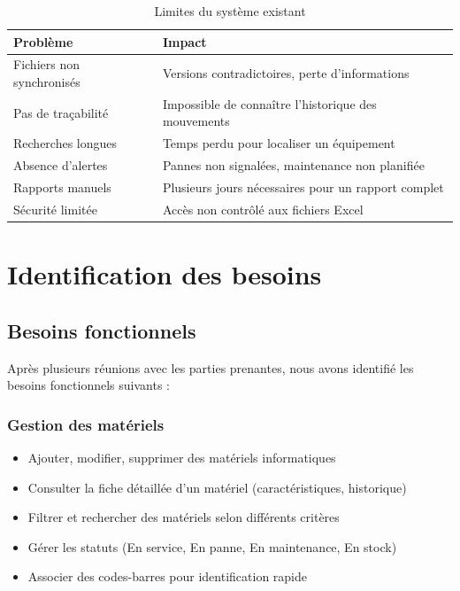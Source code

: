 \documentclass[12pt,a4paper]{report}
\begin{document}
\begin{table}[H]
\centering
\caption{Limites du système existant}
\begin{tabularx}{\textwidth}{|l|X|}
\hline
\textbf{Problème} & \textbf{Impact} \\
\hline
Fichiers non synchronisés & Versions contradictoires, perte d'informations \\
\hline
Pas de traçabilité & Impossible de connaître l'historique des mouvements \\
\hline
Recherches longues & Temps perdu pour localiser un équipement \\
\hline
Absence d'alertes & Pannes non signalées, maintenance non planifiée \\
\hline
Rapports manuels & Plusieurs jours nécessaires pour un rapport complet \\
\hline
Sécurité limitée & Accès non contrôlé aux fichiers Excel \\
\hline
\end{tabularx}
\end{table}

\section{Identification des besoins}

\subsection{Besoins fonctionnels}

Après plusieurs réunions avec les parties prenantes, nous avons identifié les besoins fonctionnels suivants :

\subsubsection{Gestion des matériels}

\begin{itemize}
    \item Ajouter, modifier, supprimer des matériels informatiques
    \item Consulter la fiche détaillée d'un matériel (caractéristiques, historique)
    \item Filtrer et rechercher des matériels selon différents critères
    \item Gérer les statuts (En service, En panne, En maintenance, En stock)
    \item Associer des codes-barres pour identification rapide
\end{itemize}
\end{document}
